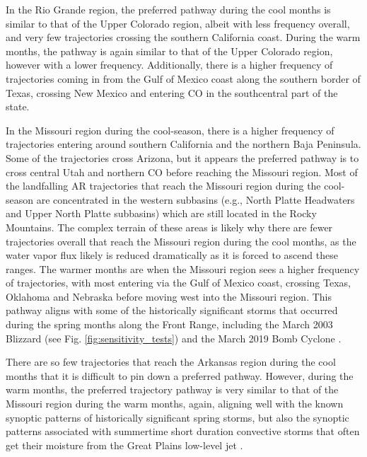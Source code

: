 \documentclass[draft]{agujournal2019}
\begin{document}
In the Rio Grande region, the preferred pathway during the cool months is similar to that of the Upper Colorado region, albeit with less frequency overall, and very few trajectories crossing the southern California coast. During the warm months, the pathway is again similar to that of the Upper Colorado region, however with a lower frequency. Additionally, there is a higher frequency of trajectories coming in from the Gulf of Mexico coast along the southern border of Texas, crossing New Mexico and entering CO in the southcentral part of the state. 

In the Missouri region during the cool-season, there is a higher frequency of trajectories entering around southern California and the northern Baja Peninsula. Some of the trajectories cross Arizona, but it appears the preferred pathway is to cross central Utah and northern CO before reaching the Missouri region. Most of the landfalling AR trajectories that reach the Missouri region during the cool-season are concentrated in the western subbasins (e.g., North Platte Headwaters and Upper North Platte subbasins) which are still located in the Rocky Mountains. The complex terrain of these areas is likely why there are fewer trajectories overall that reach the Missouri region during the cool months, as the water vapor flux likely is reduced dramatically as it is forced to ascend these ranges.  The warmer months are when the Missouri region sees a higher frequency of trajectories, with most entering via the Gulf of Mexico coast, crossing Texas, Oklahoma and Nebraska before moving west into the Missouri region. This pathway aligns with some of the historically significant storms that occurred during the spring months along the Front Range, including the March 2003 Blizzard (see Fig. \ref{fig:sensitivity_tests}) and the March 2019 Bomb Cyclone \cite{Zou2024A2019}. 

There are so few trajectories that reach the Arkansas region during the cool months that it is difficult to pin down a preferred pathway. However, during the warm months, the preferred trajectory pathway is very similar to that of the Missouri region during the warm months, again, aligning well with the known synoptic patterns of historically significant spring storms, but also the synoptic patterns associated with summertime short duration convective storms that often get their moisture from the Great Plains low-level jet \cite{Pu2016DynamicalPrecipitation, Helfand1995ClimatologyStates, Weaver2008VariabilityImpacts, Schubert1998SubseasonalStates}.
\end{document}
